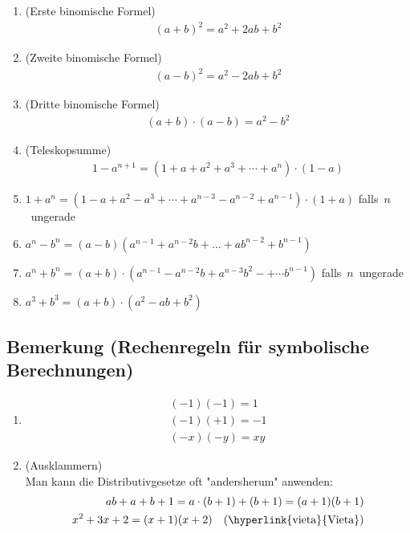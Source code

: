 	\begin{enumerate}
	\item (Erste binomische Formel)
		\begin{align*}
		(a+b)^2=a^2+2ab+b^2		
		\end{align*}
				
	\item (Zweite binomische Formel)
		\begin{align*}
		(a-b)^2=a^2-2ab+b^2		
		\end{align*}
		
	\item (Dritte binomische Formel)
		\begin{align*}
		(a+b)\cdot (a-b)=a^2-b^2		
		\end{align*}		
		
	\item (Teleskopsumme)			
		\begin{align*}
		1-a^{n+1} = (1 + a + a^2 + a^3 + \cdots + a^n) \cdot (1-a)
		\end{align*}

	\item $1+a^n = (1 - a + a^2 - a^3 + \cdots + a^{n-3} - a^{n-2} + a^{n-1}) \cdot (1+a)$ falls~$n$~ungerade
	\item $a^n - b^n=(a-b)(a^{n-1}+a^{n-2}b+\ldots +ab^{n-2}+b^{n-1})$
	\item $a^n + b^n = (a+b) \cdot (a^{n-1} - a^{n-2} b + a^{n-3} b^2 -+ \cdots b^{n-1})$ falls~$n$~ungerade
	\item $a^3 + b^3 = (a+b) \cdot (a^2 - ab + b^2)$
	
	\end{enumerate}
	
	
\subsection[Rechenregeln für symbolische Berechnungen]{Bemerkung (Rechenregeln für symbolische Berechnungen)}

	\begin{enumerate}
	\item 	\begin{align*}
			(-1)(-1) = 1 \\
			(-1)(+1)=-1 \\
			(-x)(-y)=xy
			\end{align*}
	
	\item (Ausklammern)\\ Man kann die Distributivgesetze oft "andersherum" anwenden:
			\begin{align*}
			ab+a+b+1=a\cdot (b+1)+(b+1)=(a+1)(b+1)\\
			x^2+3x+2= (x+1)(x+2) \quad \textnormal{(\hyperlink{vieta}{Vieta})}		
			\end{align*}
	
	\end{enumerate}

